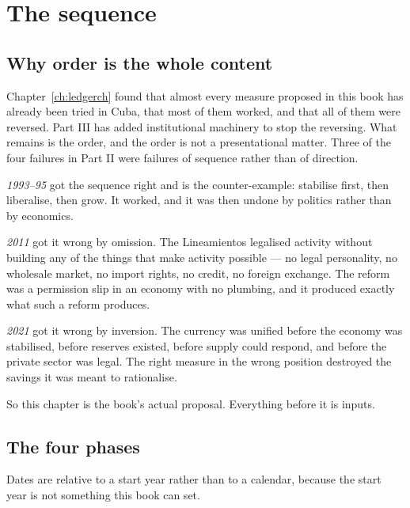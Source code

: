 \chapter{The sequence}
\label{ch:sequence}

\section{Why order is the whole content}

Chapter~\ref{ch:ledgerch} found that almost every measure proposed in this book
has already been tried in Cuba, that most of them worked, and that all of them
were reversed. Part III has added institutional machinery to stop the reversing.
What remains is the order, and the order is not a presentational matter. Three of
the four failures in Part II were failures of sequence rather than of direction.

\emph{1993--95} got the sequence right and is the counter-example: stabilise
first, then liberalise, then grow. It worked, and it was then undone by politics
rather than by economics.

\emph{2011} got it wrong by omission. The Lineamientos legalised activity without
building any of the things that make activity possible --- no legal personality,
no wholesale market, no import rights, no credit, no foreign exchange. The reform
was a permission slip in an economy with no plumbing, and it produced exactly
what such a reform produces.

\emph{2021} got it wrong by inversion. The currency was unified before the
economy was stabilised, before reserves existed, before supply could respond, and
before the private sector was legal. The right measure in the wrong position
destroyed the savings it was meant to rationalise.

So this chapter is the book's actual proposal. Everything before it is inputs.

\section{The four phases}

Dates are relative to a start year rather than to a calendar, because the start
year is not something this book can set.

